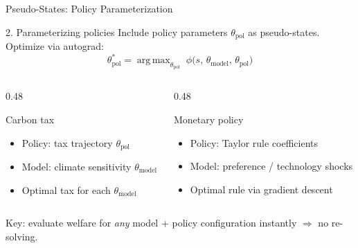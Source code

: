 \documentclass[aspectratio=169,11pt]{beamer}
\newcommand{\emphc}[1]{\textcolor{harvardcrimson}{#1}}
\DeclareMathOperator*{\argmax}{arg\,max}
\begin{document}
\begin{frame}{Pseudo-States: Policy Parameterization}
\begin{block}{2. Parameterizing policies}
Include \emphc{policy parameters} $\theta_{\text{pol}}$ as pseudo-states.  Optimize via autograd:
\vspace{-4pt}
\[
\theta_{\text{pol}}^* = \argmax_{\theta_{\text{pol}}} \;\phi\bigl(s,\, \theta_{\text{model}},\, \theta_{\text{pol}}\bigr)
\]
\vspace{-6pt}
\end{block}

\vspace{0.1cm}
\begin{columns}[T]
\begin{column}{0.48\textwidth}
\begin{exampleblock}{Carbon tax}
\begin{itemize}\setlength{\itemsep}{0pt}
  \item Policy: tax trajectory $\theta_{\text{pol}}$
  \item Model: climate sensitivity $\theta_{\text{model}}$
  \item Optimal tax for each $\theta_{\text{model}}$
\end{itemize}
\end{exampleblock}
\end{column}
\begin{column}{0.48\textwidth}
\begin{exampleblock}{Monetary policy}
\begin{itemize}\setlength{\itemsep}{0pt}
  \item Policy: Taylor rule coefficients
  \item Model: preference / technology shocks
  \item Optimal rule via gradient descent
\end{itemize}
\end{exampleblock}
\end{column}
\end{columns}

\vspace{0.15cm}
\emphc{Key:} evaluate welfare for \emph{any} model + policy configuration instantly $\Rightarrow$ no re-solving.
\end{frame}
\end{document}
